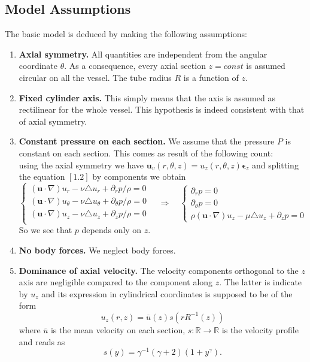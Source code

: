 \documentclass[a4paper]{report}
\begin{document}
\subsection{Model Assumptions}
The basic model is deduced by making the following assumptions:
\begin{enumerate}
	\item \textbf{Axial symmetry.} All quantities are independent from the angular coordinate $\theta$. As a consequence, every axial 	section $z=const$ is assumed circular on all the vessel. The tube radius $R$ is a function of $z$.
	\item \textbf{Fixed cylinder axis.} This simply means that the axis is assumed as rectilinear for the whole vessel. This hypothesis is indeed consistent with that of axial symmetry.
	\item \textbf{Constant pressure on each section.} We assume that the pressure $P$ is constant on each section. This comes as result of the following count:\\
using the axial symmetry we have $\mathbf{u}_{v}(r,\theta,z)=u_{z}(r,\theta,z) \boldsymbol{\epsilon}_{z}$ and splitting the equation $[1.2]$ by components we obtain
		\begin{equation}
			\begin{cases}
				(\mathbf{u} \cdot \nabla) u_{r} - \nu \triangle u_{r}+\partial_{r} p / \rho = 0\\
				(\mathbf{u} \cdot \nabla) u_{\theta} - \nu \triangle u_{\theta}+\partial_{\theta} p / \rho = 0\\
				(\mathbf{u} \cdot \nabla) u_{z} - \nu \triangle u_{z}+\partial_{z} p / \rho = 0\\
			\end{cases} \quad
		\Rightarrow \quad
			\begin{cases}
				\partial_{r} p = 0\\
				\partial_{\theta} p = 0\\
				\rho (\mathbf{u} \cdot \nabla) u_{z} -\mu \triangle u_{z} + \partial_{z} p = 0
			\end{cases}
		\end{equation}
		So we see that $p$ depends only on $z$.
	\item \textbf{No body forces.} We neglect body forces.
	\item \textbf{Dominance of axial velocity.} The velocity components orthogonal to the $z$ axis are negligible compared to the component along $z$. The latter is indicate by $u_{z}$ and its expression in cylindrical coordinates is supposed to be of the form
		\begin{equation}
			u_{z}(r,z) = \overline{u} (z)  s(r R^{-1}(z))
		\end{equation}
	where $\overline{u}$ is the mean velocity on each section, $s: \mathbb{R}\rightarrow \mathbb{R}$ is the velocity profile and reads as
		\begin{equation}
			s(y)= \gamma^{-1} (\gamma + 2) (1+y^{\gamma}).
		\end{equation}
\end{enumerate}
\end{document}
